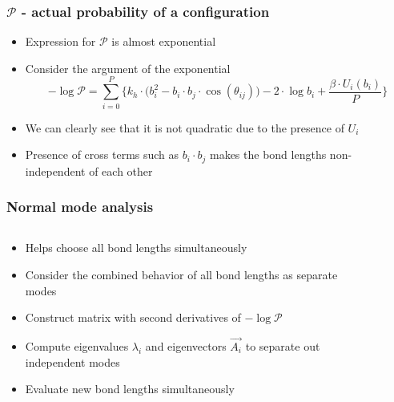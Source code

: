 \documentclass[xcolor=svgnames]{beamer}
\begin{document}
	\begin{frame}
	\frametitle{$\mathcal{P}$ - actual probability of a configuration}
	\begin{itemize}
	\justifying
	\item Expression for $\mathcal{P}$ is almost exponential
	\item Consider the argument of the exponential
	\begin{equation*}
	- \log \mathcal{P} = \displaystyle\sum\limits_{i=0}^P \Bigg\{ k_h \cdot \Big( b_i^2 - b_i \cdot b_j \cdot \cos (\theta_{ij}) \Big) - 2 \cdot \log b_i + \frac{ \beta \cdot U_i (b_i)}{P} \Bigg\}
	\end{equation*}
	\item We can clearly see that it is not quadratic due to the presence of $U_i$
	\item Presence of cross terms such as $b_i \cdot b_j$ makes the bond lengths non-independent of each other
	\end{itemize}
	\end{frame}
	
	\begin{frame}
	\frametitle{Normal mode analysis}
	\begin{columns}[c]
	\begin{column}{6cm}
	\begin{itemize}
	\justifying
	\item Helps choose all bond lengths simultaneously
	\item Consider the combined behavior of all bond lengths as separate modes
	\item Construct matrix with second derivatives of $- \log \mathcal{P}$
	\item Compute eigenvalues $\lambda_i$ and eigenvectors $\vec{A_i}$ to separate out independent modes
	\item Evaluate new bond lengths simultaneously
	\end{itemize}
	\end{column}

	\begin{column}{4cm}
	\begin{figure}
	\centering
	\def\svgscale{0.3}
	
	\end{figure}
	\end{column}
	\end{columns}
	\end{frame}
\end{document}
